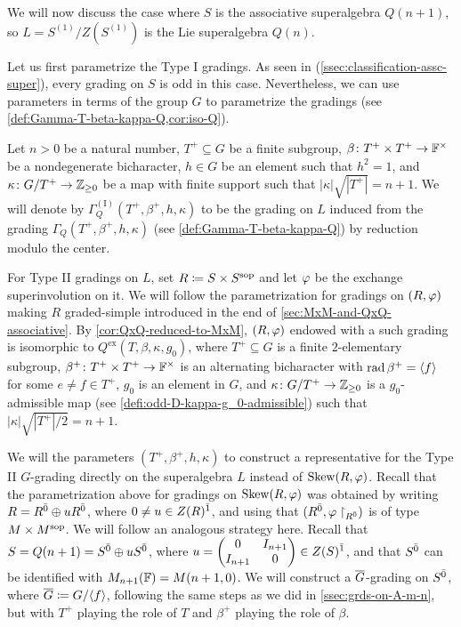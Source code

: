 We will now discuss the case where $S$ is the associative superalgebra $Q(n+1)$, so $L = S^{(1)}/Z(S^{(1)})$ is the Lie superalgebra $Q(n)$. 

Let us first parametrize the Type I gradings. 
As seen in (\cref{ssec:classification-assc-super}), every grading on $S$ is odd in this case. 
Nevertheless, we can use parameters in terms of the group $G$ to parametrize the gradings (see \cref{def:Gamma-T-beta-kappa-Q,cor:iso-Q}).  

\begin{defi}\label{def:Q-Type-I}
    Let $n > 0$ be a natural number, $T^+ \subseteq G$ be a finite subgroup, $\beta\colon T^+ \times T^+ \to \mathbb{F}^\times$ be a nondegenerate bicharacter, $h\in G$ be an element such that $h^2 = 1$, and $\kappa\colon G/T^+ \to \mathbb{Z}_{\geq 0}$ be a map with finite support such that $|\kappa| \sqrt{|T^+|} = n + 1$. 
    We will denote by $\Gamma^{\mathrm{(I)}}_Q(T^+, \beta^+, h, \kappa)$ to be the grading on $L$ induced from the grading $\Gamma_Q (T^+, \beta^+, h, \kappa)$ (see \cref{def:Gamma-T-beta-kappa-Q}) by reduction modulo the center. 
\end{defi}

For Type II gradings on $L$,
set $R \coloneqq S\times S^{\mathrm{sop}}$ and let $\varphi$ be the exchange superinvolution on it. 
We will follow the parametrization for gradings on $(R, \varphi)$ making $R$ graded-simple introduced in the end of \cref{sec:MxM-and-QxQ-associative}. 
By  \cref{cor:QxQ-reduced-to-MxM}, $(R, \varphi)$ endowed with a such grading is isomorphic to $Q^{\mathrm{ex}} (T, \beta, \kappa, g_0)$, where $T^+ \subseteq G$ is a finite $2$-elementary subgroup, $\beta^+\colon T^+\times T^+ \to \mathbb{F}^\times$ is an alternating bicharacter with $\operatorname{rad} \beta^+ = \langle f \rangle$ for some $e\neq f \in T^+$, $g_0$ is an element in $G$, and $\kappa\colon G/T^+ \to \mathbb{Z}_{\geq 0}$ is a $g_0$-admissible map (see \cref{defi:odd-D-kappa-g_0-admissible}) such that $|\kappa| \sqrt{|T^+|/2} = n+1$. 

We will the parameters $(T^+, \beta^+, h, \kappa)$ to construct a representative for the Type II $G$-grading directly on the superalgebra $L$ instead of $\operatorname{Skew}(R, \varphi)$. 
Recall that the parametrization above for gradings on $\operatorname{Skew}(R, \varphi)$ was obtained by writing $R = R^{\bar0} \oplus u R^{\bar0}$, where $0 \neq u \in Z(R)^{\bar1}$, and using that $(R^{\bar0}, \varphi\restriction_{R^{\bar0}})$ is of type $M\times M^{\mathrm{sop}}$.  
We will follow an analogous strategy here. %
Recall that $S = Q(n+1) = S^{\bar0} \oplus u S^{\bar0}$, where
$
    u = \begin{pmatrix}
            0 & I_{n+1}\\
            I_{n+1} & 0\\
        \end{pmatrix} \in Z(S)^{\bar1}
$,
and that $S^{\bar0}$ can be identified with $M_{n+1}(\mathbb{F}) = M(n+1, 0)$. 
We will construct a $\barr G$-grading on $S^{\bar0}$, where $\barr G \coloneqq G/\langle f \rangle$, following the same steps as we did in \cref{ssec:grds-on-A-m-n}, but with $T^+$ playing the role of $T$ and $\beta^+$ playing the role of $\beta$. 


